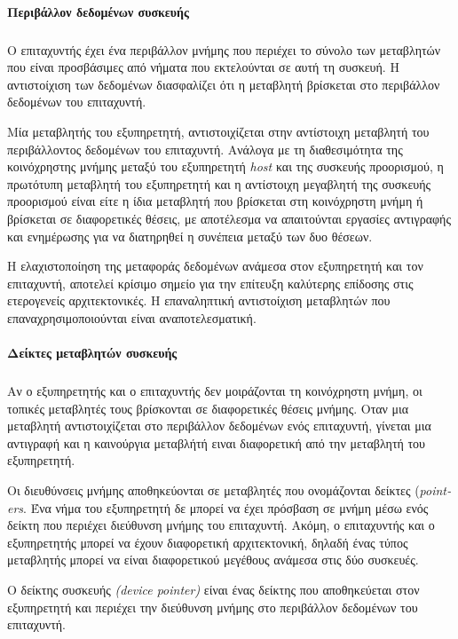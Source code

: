 \documentclass[12pt]{article}
\newcommand{\en}[1]{\foreignlanguage{english}{#1}}
\begin{document}
\paragraph{Περιβάλλον δεδομένων συσκευής}
\subparagraph{}
Ο επιταχυντής έχει ένα περιβάλλον μνήμης που περιέχει το σύνολο των μεταβλητών που είναι προσβάσιμες από νήματα που εκτελούνται σε αυτή τη συσκευή. Η αντιστοίχιση των δεδομένων διασφαλίζει ότι η μεταβλητή βρίσκεται στο περιβάλλον δεδομένων του επιταχυντή.

Μία μεταβλητής του εξυπηρετητή, αντιστοιχίζεται στην αντίστοιχη μεταβλητή του περιβάλλοντος δεδομένων του επιταχυντή.
Ανάλογα με τη διαθεσιμότητα της κοινόχρηστης μνήμης μεταξύ του εξυπηρετητή \emph{\en{host}} και της συσκευής προορισμού, η πρωτότυπη μεταβλητή του εξυπηρετητή και η αντίστοιχη μεγαβλητή της συσκευής προορισμού είναι είτε η ίδια μεταβλητή που βρίσκεται στη κοινόχρηστη μνήμη ή βρίσκεται σε διαφορετικές θέσεις, με αποτέλεσμα να απαιτούνται εργασίες αντιγραφής και ενημέρωσης για να διατηρηθεί η συνέπεια μεταξύ των δυο θέσεων.

Η ελαχιστοποίηση της μεταφοράς δεδομένων ανάμεσα στον εξυπηρετητή και τον επιταχυντή, αποτελεί κρίσιμο σημείο για την επίτευξη καλύτερης επίδοσης στις ετερογενείς αρχιτεκτονικές.
Η επαναληπτική αντιστοίχιση μεταβλητών που επαναχρησιμοποιούνται είναι αναποτελεσματική.

\paragraph{Δείκτες μεταβλητών συσκευής}
\subparagraph{}
Αν ο εξυπηρετητής και ο επιταχυντής δεν μοιράζονται τη κοινόχρηστη μνήμη, οι τοπικές μεταβλητές τους βρίσκονται σε διαφορετικές θέσεις μνήμης. Οταν μια μεταβλητή αντιστοιχίζεται στο περιβάλλον δεδομένων ενός επιταχυντή, γίνεται μια αντιγραφή και η καινούργια μεταβλήτή ειναι διαφορετική από την μεταβλητή του εξυπηρετητή.

Οι διευθύνσεις μνήμης αποθηκεύονται σε μεταβλητές που ονομάζονται δείκτες (\emph{\en{pointers}}. Ένα νήμα του εξυπηρετητή δε μπορεί να έχει πρόσβαση σε μνήμη μέσω ενός δείκτη που περιέχει διεύθυνση μνήμης του επιταχυντή. Ακόμη, ο επιταχυντής και ο εξυπηρετητής μπορεί να έχουν διαφορετική αρχιτεκτονική, δηλαδή ένας τύπος μεταβλητής μπορεί να είναι διαφορετικού μεγέθους ανάμεσα στις δύο συσκευές.

Ο δείκτης συσκευής \emph{\en{(device pointer)}} είναι ένας δείκτης που αποθηκεύεται στον εξυπηρετητή και περιέχει την διεύθυνση μνήμης στο περιβάλλον δεδομένων του επιταχυντή.
\end{document}
